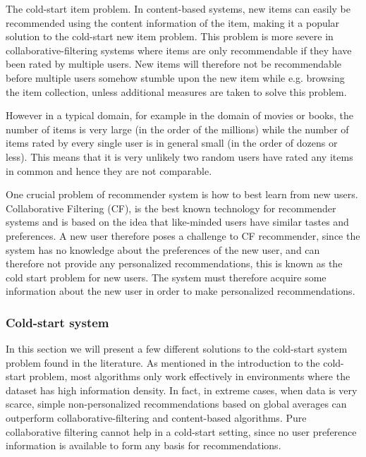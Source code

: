 The cold-start item problem. In content-based systems, new items can easily be recommended using the content information of the item, making it a popular solution \cite{} to the cold-start new item problem. This problem is more severe in collaborative-filtering systems where items are only recommendable if they have been rated by multiple users. New items will therefore not be recommendable before multiple users somehow stumble upon the new item while e.g. browsing the item collection, unless additional measures are taken to solve this problem.

However in a typical domain, for example in the domain of movies or books, the number of items is very large (in the order of the millions) while the number of items rated by every single user is in general small (in the order of dozens or less). This means that it is very unlikely two random users have rated any items in common and hence they are not comparable.

One crucial problem of recommender system is how to best learn from new users. Collaborative Filtering (CF), is the best known technology for recommender systems and is based on the idea that like-minded users have similar tastes and preferences. A new user therefore poses a challenge to CF recommender, since the system has no knowledge about the preferences of the new user, and can therefore not provide any personalized recommendations, this is known as the cold start problem for new users. The system must therefore acquire some information about the new user in order to make personalized recommendations.

\subsubsection{Cold-start system}

In this section we will present a few different solutions to the cold-start system problem found in the literature. As mentioned in the introduction to the cold-start problem, most algorithms only work effectively in environments where the dataset has high information density. In fact, in extreme cases, when data is very scarce, simple non-personalized recommendations based on global averages can outperform collaborative-filtering and content-based algorithms. Pure collaborative filtering cannot help in a cold-start setting, since no user preference information is available to form any basis for recommendations.


